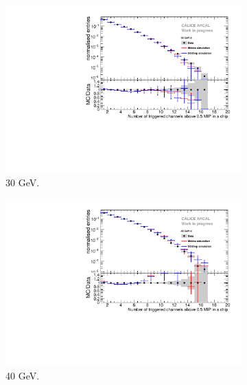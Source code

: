 \documentclass{JINST}
\begin{document}
\begin{figure}[htbp!]
\begin{subfigure}[t]{0.49\textwidth}
    \includegraphics[width=1\textwidth]{fig/Comparison_SimData_Electrons_nHits_30GeV.pdf}
    \caption{30 GeV.}\label{fig:elec_sim_data_nHits_30GeV}
  \end{subfigure}
  \hfill
  \begin{subfigure}[t]{0.49\textwidth}
    \centering
    \includegraphics[width=1\textwidth]{fig/Comparison_SimData_Electrons_nHits_40GeV.pdf}
    \caption{40 GeV.}\label{fig:elec_sim_data_nHits_40GeV}
  \end{subfigure}
  \hfill
  \begin{subfigure}[t]{0.49\textwidth}
    \centering

\end{subfigure}
\end{figure}
\end{document}
